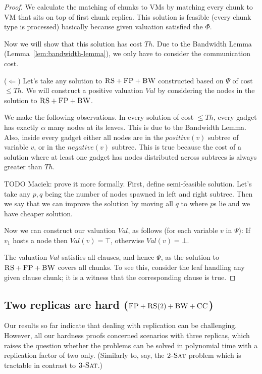 \documentclass[9pt,twocolumn]{scrartcl}
\newcommand{\clauses}{\alpha}
\newcommand{\CC}{\textsc{CC}}
\newcommand{\FP}{\textsc{FP}}
\newcommand{\RS}{\textsc{RS}}
\newcommand{\BW}{\textsc{BW}}
\newcommand{\TSAT}{\textsc{3-Sat}}
\newcommand{\ZSAT}{\textsc{2-Sat}}
\newcommand{\Formula}{\ensuremath{\Psi}}
\newcommand{\Thr}{\ensuremath{Th}}
\newcommand{\positive}{\ensuremath{positive}}
\newcommand{\negative}{\ensuremath{negative}}
\newcommand{\Val}{\ensuremath{Val}}
\begin{document}
\begin{appendix}
\begin{proof}
We calculate the matching of chunks to VMs by matching every chunk to
VM that sits on top of first chunk replica. This solution is feasible
(every chunk type is processed) basically
because given valuation satisfied the $\Phi$.

Now we will show that this solution has cost $\Thr$.
Due to the Bandwidth Lemma (Lemma~\ref{lem:bandwidth-lemma}),
we only have to consider the communication cost.

($\Leftarrow$) Let's take any solution to $\RS+\FP+\BW$ constructed based on $\Formula$ of cost $\leq \Thr$.
We will construct a positive valuation $\Val$ by considering the nodes in
the solution to $\RS+\FP+\BW$.

We make the following observations. In every solution of cost
$\leq \Thr$, every gadget has exactly $\clauses$ many nodes
at its leaves. This is due to the Bandwidth Lemma. Also, inside
every gadget either all nodes are in the $\positive(v)$ subtree
of variable $v$, or in the $\negative(v)$ subtree. This is true
because the cost of a solution where at least one gadget has nodes
distributed across subtrees is
always greater than $\Thr$.

TODO Maciek: prove it more formally. First, define semi-feasible solution. Let's take any $p,q$ being the number of nodes
spawned in left and right subtree. Then we say that we can improve the
solution by moving all $q$ to where $p$s lie and we have cheaper solution.

Now we can construct our valuation $\Val$, as follows
(for each variable $v$ in $\Formula$):
If $v_1$ hosts a node then $\Val(v) = \top$,
otherwise $\Val(v) = \bot$.

The valuation $\Val$ satisfies all clauses, and hence $\Formula$,
as the solution to $\RS+\FP+\BW$ covers all chunks. To see this,
consider the leaf handling any given clause chunk;
it is a witness that the corresponding clause is true.
\end{proof}

\subsection{Two replicas are hard ($\FP+\RS(2)+\BW+\CC$)}\label{ssec:two}

Our results so far indicate that dealing with replication can be challenging.
However, all our hardness proofs concerned scenarios with three replicas,
which raises the question whether the problems can be solved in polynomial time
with a replication factor of two only. (Similarly to, say, the $\ZSAT$ problem
which is tractable in contrast to $\TSAT$.)


\end{appendix}
\end{document}
